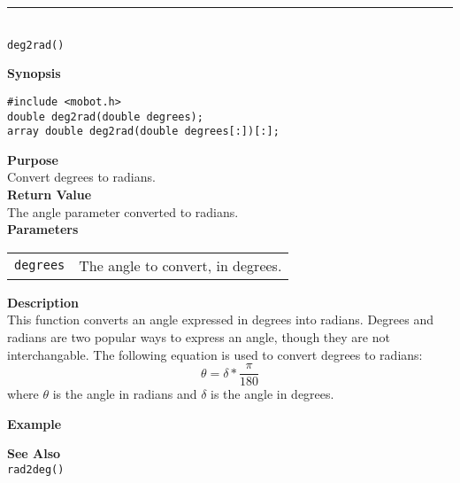 \noindent
\vspace{5pt}
\rule{4.5in}{0.015in}\\
\noindent
{\LARGE \texttt{deg2rad()}}\\
{}

\noindent
{\bf Synopsis}
\vspace{-8pt}
\begin{verbatim}
#include <mobot.h>
double deg2rad(double degrees);
array double deg2rad(double degrees[:])[:];
\end{verbatim}

\noindent
{\bf Purpose}\\
Convert degrees to radians.\\

\noindent
{\bf Return Value}\\
The angle parameter converted to radians.\\

\noindent
{\bf Parameters}
\vspace{-0.1in}
\begin{description}
\item               
\begin{tabular}{p{15 mm}p{145 mm}}
\texttt{degrees} & The angle to convert, in degrees. \\
\end{tabular}
\end{description}

\noindent
{\bf Description}\\
This function converts an angle expressed in degrees into radians. Degrees and
radians are two popular ways to express an angle, though they are not interchangable.
The following equation is used to convert degrees to radians:
\begin{equation*}
\theta = \delta * \frac{\pi}{180}
\end{equation*}
where $\theta$ is the angle in radians and $\delta$ is the angle in degrees.

\noindent
{\bf Example}\\
\noindent

\noindent
{\bf See Also}\\
\texttt{rad2deg()}


